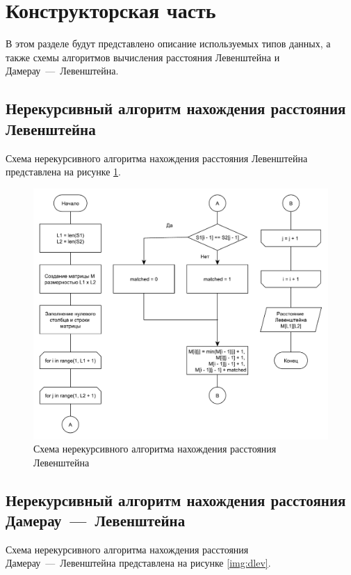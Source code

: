 \section{Конструкторская часть}

В этом разделе будут представлено описание используемых типов данных, а также схемы алгоритмов вычисления расстояния Левенштейна и Дамерау~---~Левенштейна.

\subsection{Нерекурсивный алгоритм нахождения расстояния Левенштейна}

Схема нерекурсивного алгоритма нахождения расстояния Левенштейна представлена на рисунке \ref{img:lev}.

\begin{figure}[h]
	\centering
	\includegraphics[scale=0.6]{images/lev.pdf}
	\caption{Схема нерекурсивного алгоритма нахождения расстояния Левенштейна}
	\label{img:lev}
\end{figure}

\newpage

\subsection{Нерекурсивный алгоритм нахождения расстояния Дамерау~---~Левенштейна}

Схема нерекурсивного алгоритма нахождения расстояния Дамерау~---~Левенштейна представлена на рисунке \ref{img:dlev}.

